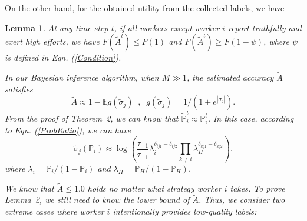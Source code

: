\documentclass{article}
\makeatletter
\newcounter{lemmas}
\newtheorem{lemma}[lemmas]{Lemma}
\renewenvironment{proof}[1][\proofname]{\par
  \vspace{-\topsep}%
  \pushQED{\qed}%
  \normalfont
  \topsep0pt \partopsep0pt %
  \trivlist
  \item[\hskip\labelsep
        \itshape
    #1\@addpunct{.}]\ignorespaces
}{%
  \popQED\endtrivlist\@endpefalse
  \addvspace{0pt plus 0pt} %
}
\makeatother
\begin{document}
On the other hand, for the obtained utility from the collected labels, we have 
\begin{lemma}
\label{ConvBoundxx}
At any time step $t$, if all workers except worker $i$ report truthfully and exert high efforts, we have $F(\tilde{A}^t)\leq F(1)$ and $F(\tilde{A}^t)\geq F(1-\psi)$, where $\psi$ is defined in Eqn. (\ref{Condition}).
\begin{proof}
In our Bayesian inference algorithm, when $M\gg 1$, the estimated accuracy $\tilde{A}$ satisfies
\begin{equation}
\label{accP}
\tilde{A} \approx 1-\mathbb{E}g(\tilde{\sigma}_j)\;\;,\;\; g(\tilde{\sigma}_j)=1/(1+e^{|\tilde{\sigma}_j|}).
\end{equation}
From the proof of Theorem~2, we can know that $\tilde{\mathbb{P}}^{t}_i \approx \mathbb{P}^{t}_i$.
In this case, according to Eqn. (\ref{ProbRatio}), we can have
\begin{equation}
\label{ProbRatioApp}
\tilde{\sigma}_j(\mathbb{P}_i)\approx \log\left(\frac{\tau_{-1}}{\tau_{+1}}\lambda_i^{\delta_{ij1}-\delta_{ij2}}{\prod}_{k\neq i}\lambda_H^{\delta_{kj1}-\delta_{kj2}}\right).
\end{equation}
where $\lambda_i=\mathbb{P}_i/(1-\mathbb{P}_i)$ and $\lambda_H=\mathbb{P}_H/(1-\mathbb{P}_H)$.

We know that $\tilde{A}\leq 1.0$ holds no matter what strategy worker $i$ takes. To prove Lemma~2, we still need to know the lower bound of $\tilde{A}$. Thus, we consider two extreme cases where worker $i$ intentionally provides low-quality labels:


\end{proof}
\end{lemma}
\end{document}

